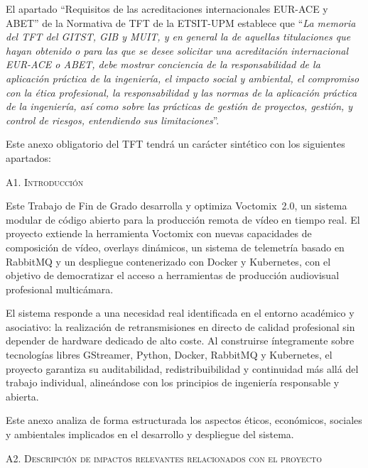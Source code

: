 \normalsize{El apartado ``Requisitos de las acreditaciones internacionales EUR-ACE y ABET'' de la
Normativa de TFT de la ETSIT-UPM establece que ``\textit{La memoria del TFT del GITST, GIB y MUIT,
y en general la de aquellas titulaciones que hayan obtenido o para las que se desee solicitar una
acreditación internacional EUR-ACE o ABET, debe mostrar conciencia de la responsabilidad de la
aplicación práctica de la ingeniería, el impacto social y ambiental, el compromiso con la ética
profesional, la responsabilidad y las normas de la aplicación práctica de la ingeniería, así como
sobre las prácticas de gestión de proyectos, gestión, y control de riesgos, entendiendo sus
limitaciones}''.

Este anexo obligatorio del TFT tendrá un carácter sintético con los siguientes apartados:}
\vspace{0.3cm}

\Large{\textsc{\textcolor{nar}{A1. Introducción}}}
\vspace{0.2cm}

\normalsize{Este Trabajo de Fin de Grado desarrolla y optimiza Voctomix~2.0, un sistema modular de
código abierto para la producción remota de vídeo en tiempo real. El proyecto extiende la
herramienta Voctomix con nuevas capacidades de composición de vídeo, overlays dinámicos, un sistema
de telemetría basado en RabbitMQ y un despliegue contenerizado con Docker y Kubernetes, con el
objetivo de democratizar el acceso a herramientas de producción audiovisual profesional multicámara.

El sistema responde a una necesidad real identificada en el entorno académico y asociativo: la
realización de retransmisiones en directo de calidad profesional sin depender de hardware dedicado
de alto coste. Al construirse íntegramente sobre tecnologías libres GStreamer, Python, Docker,
RabbitMQ y Kubernetes, el proyecto garantiza su auditabilidad, redistribuibilidad y continuidad más
allá del trabajo individual, alineándose con los principios de ingeniería responsable y abierta.

Este anexo analiza de forma estructurada los aspectos éticos, económicos, sociales y ambientales
implicados en el desarrollo y despliegue del sistema.}
\vspace{0.3cm}

\Large{\textsc{\textcolor{nar}{A2. Descripción de impactos relevantes relacionados con el proyecto}}}
\vspace{0.2cm}

